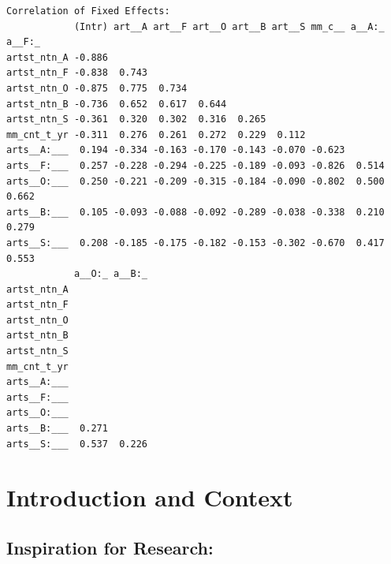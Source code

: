 \documentclass[
  letterpaper,
  DIV=11,
  numbers=noendperiod]{scrreprt}
\begin{document}
\begin{verbatim}
Correlation of Fixed Effects:
            (Intr) art__A art__F art__O art__B art__S mm_c__ a__A:_ a__F:_
artst_ntn_A -0.886                                                        
artst_ntn_F -0.838  0.743                                                 
artst_ntn_O -0.875  0.775  0.734                                          
artst_ntn_B -0.736  0.652  0.617  0.644                                   
artst_ntn_S -0.361  0.320  0.302  0.316  0.265                            
mm_cnt_t_yr -0.311  0.276  0.261  0.272  0.229  0.112                     
arts__A:___  0.194 -0.334 -0.163 -0.170 -0.143 -0.070 -0.623              
arts__F:___  0.257 -0.228 -0.294 -0.225 -0.189 -0.093 -0.826  0.514       
arts__O:___  0.250 -0.221 -0.209 -0.315 -0.184 -0.090 -0.802  0.500  0.662
arts__B:___  0.105 -0.093 -0.088 -0.092 -0.289 -0.038 -0.338  0.210  0.279
arts__S:___  0.208 -0.185 -0.175 -0.182 -0.153 -0.302 -0.670  0.417  0.553
            a__O:_ a__B:_
artst_ntn_A              
artst_ntn_F              
artst_ntn_O              
artst_ntn_B              
artst_ntn_S              
mm_cnt_t_yr              
arts__A:___              
arts__F:___              
arts__O:___              
arts__B:___  0.271       
arts__S:___  0.537  0.226
\end{verbatim}

\hypertarget{introduction-and-context}{%
\chapter{Introduction and Context}\label{introduction-and-context}}

\hypertarget{inspiration-for-research}{%
\section{Inspiration for Research:}\label{inspiration-for-research}}
\end{document}
